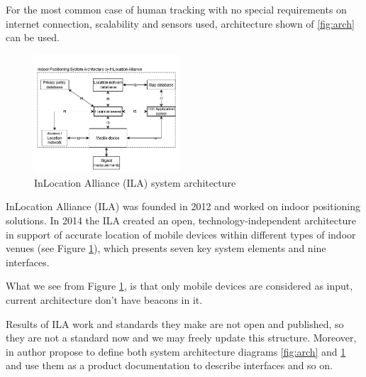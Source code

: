 For the most common case of human tracking with no special requirements on internet connection, scalability and sensors used, architecture shown of \ref{fig:arch} can be used.

\begin{figure}[h]
    \centering
    \includegraphics[width=0.48\textwidth]{img/InLocation Alliance (ILA).png}
    \caption{InLocation Alliance (ILA) system architecture}
    \label{fig:arch2}
\end{figure}

InLocation Alliance (ILA) was founded in 2012 and worked on indoor positioning solutions. In 2014 the ILA created an open, technology-independent architecture in support of accurate location of mobile devices within different types of indoor venues (see Figure \ref{fig:arch2}), which presents seven key system elements and nine interfaces.

What we see from Figure \ref{fig:arch2}, is that only mobile devices are considered as input, current architecture don't have beacons in it.

Results of ILA work and standards they make are not open and published, so they are not a standard now and we may freely update this structure.
Moreover, in \cite{Security} author propose to define both system architecture diagrams \ref{fig:arch} and \ref{fig:arch2} and use them as a product documentation to describe interfaces and so on.



